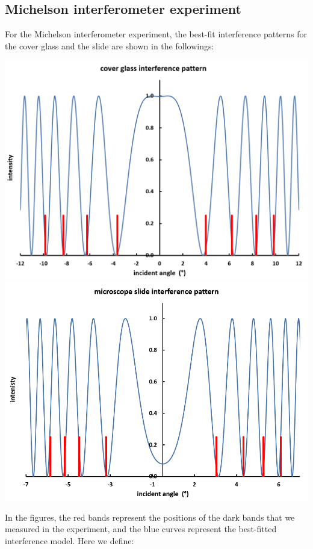 \documentclass[11pt]{book}
\theoremstyle{break}
\theoremstyle{break}
\begin{document}
\newpage 
\subsection{Michelson interferometer experiment}For the Michelson interferometer experiment, the best-fit interference patterns for the cover glass and the slide are shown in the followings:
\begin{center}
\includegraphics[scale=0.55]{coverGlass.png}\\
\hfill\break
\hfill\break
\includegraphics[scale=0.55]{slide.png}
\end{center}
In the figures, the red bands represent the positions of the dark bands that we measured in the experiment, and the blue curves represent the best-fitted interference model. Here we define:
\end{document}
